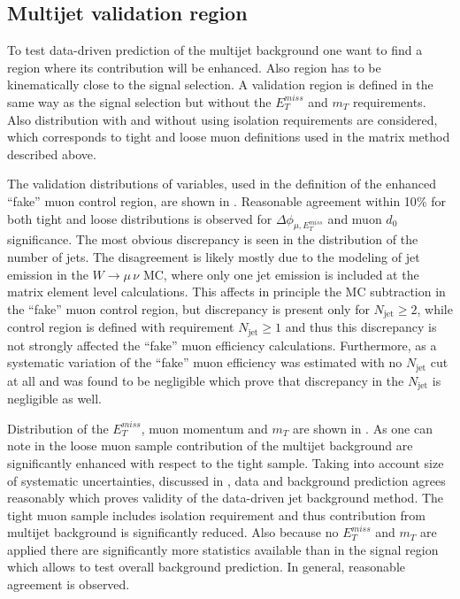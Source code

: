\subsection{Multijet validation region}

To test data-driven prediction of the multijet background one want to find a region
where its contribution will be enhanced. Also region has to be kinematically 
close to the signal selection.
A validation region is defined in the same way as the signal selection but without the $E_T^{miss}$ and $m_T$ requirements. Also distribution with and without using isolation requirements are considered, 
which corresponds to tight and loose muon definitions used in the matrix method described above.

The validation distributions of variables, used in the definition of the enhanced ``fake'' muon control region, are shown in .
Reasonable agreement within 10$\%$ for both tight and loose distributions is observed for $\Delta\phi_{\mu,E_T^{miss}}$ and muon $d_0$ significance.
The most obvious discrepancy is seen in the
distribution of the number of jets. The disagreement is likely mostly due to the modeling
of jet emission in the $W\to\mu\,\nu$ MC, where only one jet emission is included at the
matrix element level calculations.
This affects in principle the MC subtraction in the ``fake'' muon control region,
but discrepancy is present only for $N_\mathrm{jet}\geq2$, while control region is 
defined with requirement $N_\mathrm{jet}\geq1$ and thus this discrepancy is not 
strongly affected the ``fake'' muon efficiency calculations.
Furthermore, as a systematic variation of the ``fake'' muon efficiency was estimated with no $N_\mathrm{jet}$ cut at all and was found to be negligible which prove that discrepancy in
the $N_\mathrm{jet}$ is negligible as well.

Distribution of the $E_T^{miss}$, muon momentum and $m_T$ are shown in .
As one can note in the loose muon sample contribution of the multijet background are significantly enhanced with respect to the tight sample. 
Taking into account size of systematic uncertainties, discussed in , data and background prediction agrees reasonably which proves validity of the data-driven jet background method.
The tight muon sample includes isolation requirement and thus contribution from multijet background is significantly reduced. Also because no $E_T^{miss}$ and $m_T$ are applied 
there are significantly more statistics available than in the signal region which allows 
to test overall background prediction. In general, reasonable agreement is observed. 

